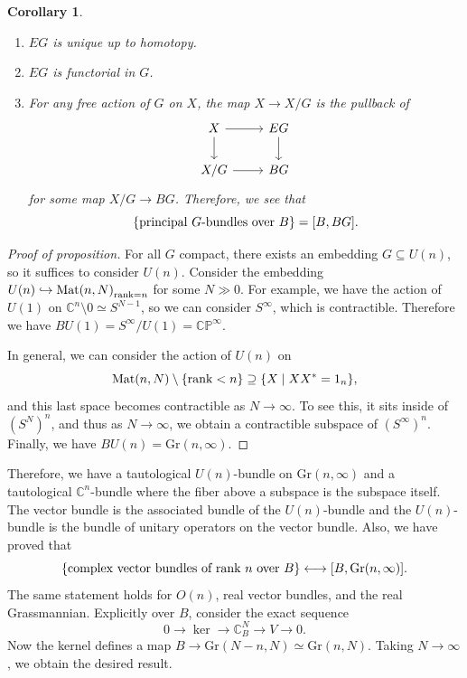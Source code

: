 \documentclass[leqno, openany]{memoir}
\newtheorem{cor}[thm]{Corollary}
\theoremstyle{definition}
\theoremstyle{remark}
\theoremstyle{plain}
\theoremstyle{definition}
\theoremstyle{remark}
\newcommand{\C}{\mathbb{C}}
\renewcommand{\P}{\mathbb{P}}
\newcommand{\mr}[1]{\mathrm{#1}}
\begin{document}
\begin{cor}\leavevmode
    \begin{enumerate}
        \item $EG$ is unique up to homotopy.
        \item $EG$ is functorial in $G$.
        \item For any free action of $G$ on $X$, the map $X \to X/G$ is the pullback of
            \begin{equation*}
            \begin{tikzcd}
                X \ar{r} \ar{d} & EG \ar{d} \\
                X/G \ar{r} & BG
            \end{tikzcd}
            \end{equation*}
            for some map $X/G \to BG$. Therefore, we see that
            \[ \qty{\text{principal $G$-bundles over $B$}} = [B, BG]. \]
    \end{enumerate}
\end{cor}

\begin{proof}[Proof of proposition]
    For all $G$ compact, there exists an embedding $G \subseteq U(n)$, so it suffices to consider $U(n)$. Consider the embedding $U(n) \hookrightarrow { \mr{Mat}(n, N) }_{\rank = n}$ for some $N \gg 0$. For example, we have the action of $U(1)$ on $\C^n \setminus 0 \simeq S^{N-1}$, so we can consider $S^{\infty}$, which is contractible. Therefore we have $BU(1) = S^{\infty} / U(1) = \C\P^{\infty}$.

    In general, we can consider the action of $U(n)$ on 
    \[ \mr{Mat}(n, N) \setminus \qty{\rank < n} \supseteq \qty{X \mid XX^* = 1_n}, \]
    and this last space becomes contractible as $N \to \infty$. To see this, it sits inside of ${(S^N)}^n$, and thus as $N \to \infty$, we obtain a contractible subspace of ${(S^{\infty})}^n$. Finally, we have $BU(n) = \mr{Gr}(n, \infty)$. 
\end{proof}

Therefore, we have a tautological $U(n)$-bundle on $\mr{Gr}(n, \infty)$ and a tautological $\C^n$-bundle where the fiber above a subspace is the subspace itself. The vector bundle is the associated bundle of the $U(n)$-bundle and the $U(n)$-bundle is the bundle of unitary operators on the vector bundle. Also, we have proved that
\[ \qty{\text{complex vector bundles of rank $n$ over $B$}} \longleftrightarrow [B, \mr{Gr}(n, \infty)]. \]
The same statement holds for $O(n)$, real vector bundles, and the real Grassmannian. Explicitly over $B$, consider the exact sequence
\[ 0 \to \ker \to \C^N_B \to V \to 0. \]
Now the kernel defines a map $B \to \mr{Gr}(N - n, N) \simeq \mr{Gr}(n, N)$. Taking $N \to \infty$, we obtain the desired result.
\end{document}
